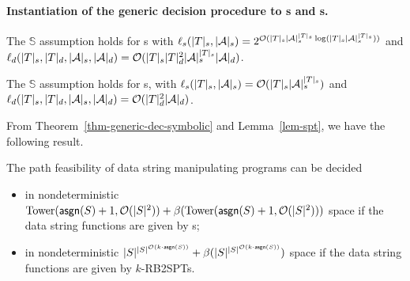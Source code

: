 \paragraph{Instantiation of the generic decision procedure to \SSPT{}s and \SPT{}s.}




\begin{lemma}\label{lem-spt}
The $\mathbb{S}$\prerec{} assumption holds for \SSPT{}s with $\ell_s(|T|_s, |\mathcal{A}|_s) = 2^{\mathcal{O}( |T|_s |\mathcal{A}|_s^{|T|_s} \log (|T|_s |\mathcal{A}|_s^{|T|_s}))}$ and  $\ell_d(|T|_s, |T|_d, |\mathcal{A}|_s, |\mathcal{A}|_d) = \mathcal{O}(|T|_s  |T|^2_d |\mathcal{A}|_s^{|T|_s} |\mathcal{A}|_d)$. 

The $\mathbb{S}$\prerec{} assumption holds for \SPT{}s, with $\ell_s(|T|_s, |\mathcal{A}|_s) =\mathcal{O}(|T|_s |\mathcal{A}|_s^{|T|_s})$ and  $\ell_d(|T|_s, |T|_d, |\mathcal{A}|_s, |\mathcal{A}|_d) = \mathcal{O}(|T|^2_d |\mathcal{A}|_d)$.
%
\end{lemma}


From Theorem~\ref{thm-generic-dec-symbolic} and Lemma~\ref{lem-spt}, we have the following result.
\begin{theorem}\label{thm-spt}
The path feasibility of data string manipulating programs can be decided 

\begin{itemize}
	\item in nondeterministic $\mathrm{Tower}(\mathsf{asgn}(S)+1, \mathcal{O}(|S|^2)) + \beta(\mathrm{Tower}(\mathsf{asgn}(S)+1, \mathcal{O}(|S|^2)))$  space if the data string functions are given by \SSPT{}s;
	
	\item  in nondeterministic $|S|^{|S|^{\mathcal{O}(k\cdot \mathsf{asgn}(S))}} + \beta(|S|^{|S|^{\mathcal{O}(k\cdot \mathsf{asgn}(S))}})$ space if the data string functions are given by $k$-RB2SPTs. %
	
\end{itemize}
%
%
\end{theorem}


